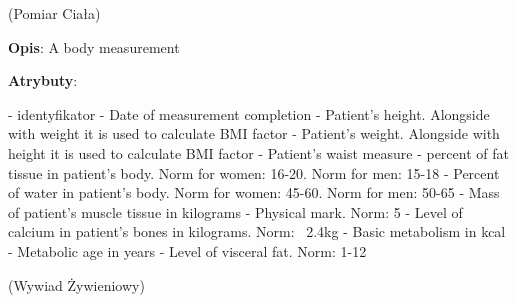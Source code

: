 \begin{enumerate}[label={\textbf{KAT/\protect\threedigits{\theenumi}}}, wide, labelwidth=!, labelindent=0pt, labelsep=0pt, series=reqs]
     \label{kat:BodyMeasurement} (Pomiar Ciała)

    \textbf{Opis}: A body measurement
    \par
    \textbf{Atrybuty}:
    \begin{itemize}[series=atr, wide, align=left, leftmargin=190pt]
         \label{kat:BodyMeasurement:id} - identyfikator
         \label{kat:BodyMeasurement:completionDate} - Date of measurement completion
         \label{kat:BodyMeasurement:height} - Patient's height. Alongside with weight it is used to calculate BMI factor
         \label{kat:BodyMeasurement:weight} - Patient's weight. Alongside with height it is used to calculate BMI factor
         \label{kat:BodyMeasurement:waist} - Patient's waist measure
         \label{kat:BodyMeasurement:percentOfFatTissue} - percent of fat tissue in patient's body. Norm for women: 16-20. Norm for men: 15-18
         \label{kat:BodyMeasurement:percentOfWater} - Percent of water in patient's body. Norm for women: 45-60. Norm for men: 50-65
         \label{kat:BodyMeasurement:muscleMass} - Mass of patient's muscle tissue in kilograms
         \label{kat:BodyMeasurement:physicalMark} - Physical mark. Norm: 5
         \label{kat:BodyMeasurement:calciumInBones} - Level of calcium in patient's bones in kilograms. Norm: ~2.4kg
         \label{kat:BodyMeasurement:basicMetabolism} - Basic metabolism in kcal
         \label{kat:BodyMeasurement:metabolicAge} - Metabolic age in years
         \label{kat:BodyMeasurement:visceralFatLevel} - Level of visceral fat. Norm: 1-12
    \end{itemize}

     \label{kat:NutritionalInterview} (Wywiad Żywieniowy)


\end{enumerate}
